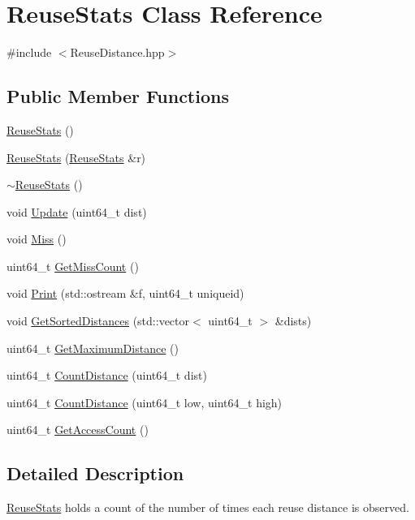 \hypertarget{class_reuse_stats}{
\section{ReuseStats Class Reference}
\label{class_reuse_stats}
}


{\ttfamily \#include $<$ReuseDistance.hpp$>$}

\subsection*{Public Member Functions}
\begin{DoxyCompactItemize}
\item 
\hyperlink{class_reuse_stats_a0106660db234ec0ea484c61cb18702e8}{ReuseStats} ()
\item 
\hyperlink{class_reuse_stats_a5c7df5f020e0f87e78b8f49c5624c823}{ReuseStats} (\hyperlink{class_reuse_stats}{ReuseStats} \&r)
\item 
\hyperlink{class_reuse_stats_a21f8a5cab3976edba08c2562c3ed8d45}{$\sim$ReuseStats} ()
\item 
void \hyperlink{class_reuse_stats_a5383136c63ed260d9aad44a8d048a2ed}{Update} (uint64\_\-t dist)
\item 
void \hyperlink{class_reuse_stats_a3d963a3b6c2c0b37b23d4e0723a70831}{Miss} ()
\item 
uint64\_\-t \hyperlink{class_reuse_stats_aeff4f3fe0f2253e1aed432b18ec85d85}{GetMissCount} ()
\item 
void \hyperlink{class_reuse_stats_a9edd9703b7de1998042cd5f72056d68a}{Print} (std::ostream \&f, uint64\_\-t uniqueid)
\item 
void \hyperlink{class_reuse_stats_adcb657e303c090ac5ef210f6c4506986}{GetSortedDistances} (std::vector$<$ uint64\_\-t $>$ \&dists)
\item 
uint64\_\-t \hyperlink{class_reuse_stats_ac70175a532ea2dc608e0fd2f04e4fcbb}{GetMaximumDistance} ()
\item 
uint64\_\-t \hyperlink{class_reuse_stats_abdb92b77ec7191be80e77a34f894e11b}{CountDistance} (uint64\_\-t dist)
\item 
uint64\_\-t \hyperlink{class_reuse_stats_a07265484c0c3b4348ea090d28de37cbe}{CountDistance} (uint64\_\-t low, uint64\_\-t high)
\item 
uint64\_\-t \hyperlink{class_reuse_stats_a48935d131ce635b1b37b2a43f0c52217}{GetAccessCount} ()
\end{DoxyCompactItemize}


\subsection{Detailed Description}
\hyperlink{class_reuse_stats}{ReuseStats} holds a count of the number of times each reuse distance is observed. 

